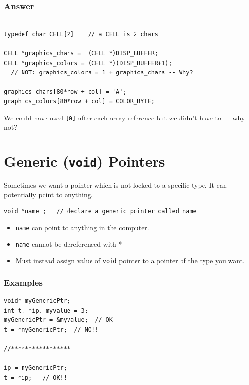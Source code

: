 \documentclass{article}	%
\begin{document}
\subsubsection*{Answer}

\begin{verbatim}

typedef char CELL[2]    // a CELL is 2 chars

CELL *graphics_chars =  (CELL *)DISP_BUFFER;
CELL *graphics_colors = (CELL *)(DISP_BUFFER+1);
  // NOT: graphics_colors = 1 + graphics_chars -- Why?

graphics_chars[80*row + col] = 'A';
graphics_colors[80*row + col] = COLOR_BYTE;

\end{verbatim}

We could have used {\tt [0]} after each array reference but we
didn't have to --- why not?



\section{Generic ({\tt void}) Pointers}

Sometimes we want a pointer which is not locked to a
specific type.  It can potentially point to anything.

\begin{verbatim}
void *name ;   // declare a generic pointer called name
\end{verbatim}

\begin{itemize}
        \item {\tt name} can point to anything in the computer.
        \item {\tt name} cannot be dereferenced with *
        \item Must instead assign value of {\tt void}
        pointer  to a pointer of the type you want. \\
\end{itemize}



\subsubsection*{Examples}
\begin{verbatim}
void* myGenericPtr;
int t, *ip, myvalue = 3;
myGenericPtr = &myvalue;  // OK
t = *myGenericPtr;  // NO!!

//*****************

ip = nyGenericPtr;
t = *ip;   // OK!!
\end{verbatim}
\end{document}
